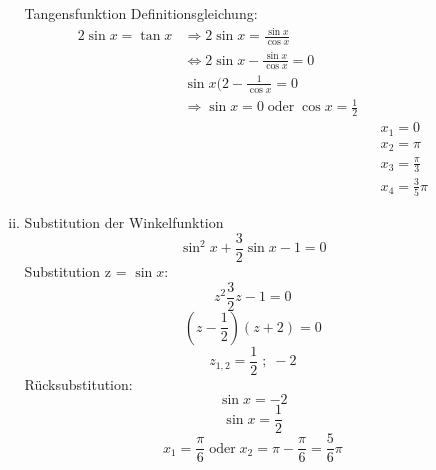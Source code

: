 \documentclass{book}
\begin{document}
\begin{enumerate}[a)]
\begin{enumerate}[i)]
                Tangensfunktion Definitionsgleichung:
                \begin{align*}
                    2\sin x = \tan x &\Rightarrow 2 \sin x  = \frac {\sin x }{\cos x} \\
                                     &\Leftrightarrow 2\sin x - \frac {\sin x }{\cos x} = 0 \\
                                     &\sin x (2 - \frac 1{\cos x} = 0 \\
                                     & \Rightarrow \sin x = 0 \; \text{oder} \; \cos x = \frac 12 \\
                                     &&& x_1 = 0 \\
                                     &&& x_2 = \pi \\
                                     &&& x_3 = \frac \pi 3 \\
                                     &&& x_4 = \frac 35 \pi
                \end{align*}

                \item Substitution der Winkelfunktion
                    \[\sin^2 x + \frac 32 \sin x - 1 = 0 \]
                    Substitution z = $\sin x$: 
                    \[z^2 \frac 32 z -1 = 0\]
                    \[(z-\frac 12)(z+2)=0\]
                    \[z_{1,2} = \frac 12 \; ; \; -2\]
                    Rücksubstitution:
                    \[\sin x = -2 \]
                    \centering \Lightning
                    \[\sin x = \frac 12 \]
                    \[x_1 = \frac \pi 6 \; \text{oder} \; x_2 = \pi - \frac \pi 6 = \frac 56 \pi\]


            \end{enumerate}
        
\end{enumerate}
    
\end{document}
